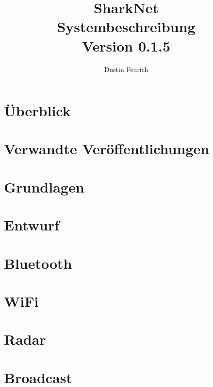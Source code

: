 \documentclass[german, 12pt]{book}
\begin{document}
\onehalfspacing

\title{SharkNet\\
Systembeschreibung \\
Version 0.1.5
}

\author{
Dustin Feurich
}

\maketitle

\tableofcontents

\chapter{Überblick}


\chapter{Verwandte Veröffentlichungen}


\chapter{Grundlagen}


\chapter{Entwurf}


\chapter{Bluetooth}


\chapter{WiFi}


\chapter{Radar}


\chapter{Broadcast}

\end{document}
